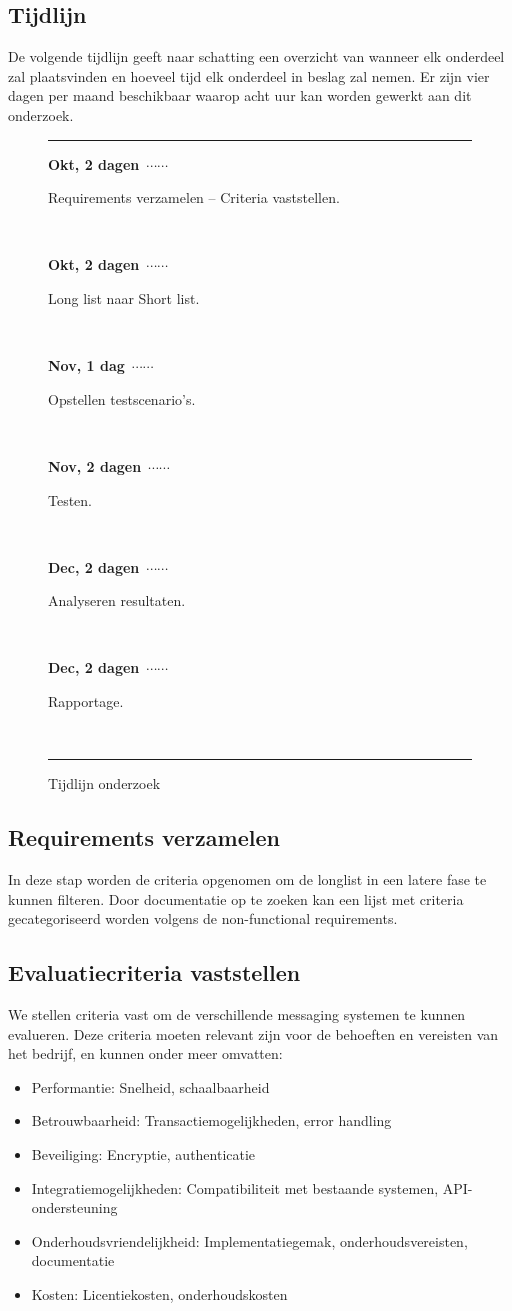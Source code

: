\bigskip

\subsection{Tijdlijn}

De volgende tijdlijn geeft naar schatting een overzicht van wanneer elk onderdeel zal plaatsvinden en hoeveel tijd elk onderdeel in beslag zal nemen. 
Er zijn vier dagen per maand beschikbaar waarop acht uur kan worden gewerkt aan dit onderzoek.

\newcommand{\ytl}[2]{
  \parbox[b]{8em}{\hfill{\color{cyan}\bfseries\sffamily #1}~$\cdots\cdots$~}\makebox[0pt][c]{$\bullet$}\vrule\quad \parbox[c]{4.5cm}{\vspace{7pt}\color{red!40!black!80}\raggedright\sffamily #2.\\[7pt]}\\[-3pt]
}

\begin{figure}[htbp]
  \centering  
  \rule{\linewidth}{1pt}
  \ytl{Okt, 2 dagen}{Requirements verzamelen -- Criteria vaststellen}
  \ytl{Okt, 2 dagen}{Long list naar Short list}
  \ytl{Nov, 1 dag}{Opstellen testscenario's}
  \ytl{Nov, 2 dagen}{Testen}
  \ytl{Dec, 2 dagen}{Analyseren resultaten}
  \ytl{Dec, 2 dagen}{Rapportage}
  \rule{\linewidth}{1pt}
  \caption{Tijdlijn onderzoek}
  \label{fig:timeline}
\end{figure}

 
\subsection{Requirements verzamelen}
In deze stap worden de criteria opgenomen om de longlist in een latere fase te kunnen filteren.
Door documentatie op te zoeken kan een lijst met criteria gecategoriseerd worden volgens de non-functional requirements.

\subsection{Evaluatiecriteria vaststellen}
We stellen criteria vast om de verschillende messaging systemen te kunnen evalueren. 
Deze criteria moeten relevant zijn voor de behoeften en vereisten van het bedrijf, en kunnen onder meer omvatten:
\begin{itemize}
  \item Performantie: Snelheid, schaalbaarheid
  \item Betrouwbaarheid: Transactiemogelijkheden, error handling
  \item Beveiliging: Encryptie, authenticatie
  \item Integratiemogelijkheden: Compatibiliteit \newline met bestaande systemen, API-ondersteuning
  \item Onderhoudsvriendelijkheid: Implementatiegemak, onderhoudsvereisten, documentatie
  \item Kosten: Licentiekosten, onderhoudskosten
\end{itemize}

